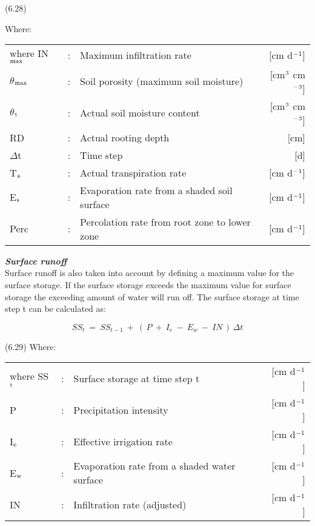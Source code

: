  
\strut\hfill (6.28)

Where:\\
\begin{tabularx}{\textwidth}{llXr}



where IN$_{{\rm max}}$ &:& Maximum infiltration rate  & [cm d$^{{\rm -1}}$]\\
$\theta$$_{{\rm max}}$ &:& Soil porosity (maximum soil moisture)  & [cm$^{{\rm 3}}$ cm$^{{\rm -3}}$]\\
$\theta$$_{{\rm t}}$ &:& Actual soil moisture content  & [cm$^{{\rm 3}}$ cm$^{{\rm -3}}$]\\
RD &:& Actual rooting depth  & [cm]\\
$\Delta$t &:& Time step  & [d]\\
T$_{{\rm a}}$ &:& Actual transpiration rate   & [cm d$^{{\rm -1}}$]\\
E$_{{\rm s}}$ &:& Evaporation rate from a shaded soil surface  & [cm d$^{{\rm -1}}$]\\
Perc &:& Percolation rate from root zone to lower zone  & [cm d$^{{\rm -1}}$]
\end{tabularx}
 {\bf {\it Surface runoff\/}}\\
Surface runoff is also taken into account by defining a maximum value for the surface
storage. If the surface storage exceeds the maximum value for surface storage the
exceeding amount of water will run off. The surface storage at time step t can be
calculated as:

\begin{equation}
SS_{t} ~=~ SS _{t-1} ~+~ (\, P ~+~ I _{e} ~-~ E _{w} ~-~ IN\, )\, \Delta t
\end{equation}

 
\strut\hfill (6.29)
Where:\\
\begin{tabularx}{\textwidth}{llXr}



where SS$_{{\rm t}}$ &:& Surface storage at time step t  & [cm d$^{{\rm -1}}$]\\
P &:& Precipitation intensity  & [cm d$^{{\rm -1}}$]\\
I$_{{\rm e}}$ &:& Effective irrigation rate  & [cm d$^{{\rm -1}}$]\\
E$_{{\rm w}}$ &:& Evaporation rate from a shaded water surface  & [cm d$^{{\rm -1}}$]\\
IN &:& Infiltration rate (adjusted)  & [cm d$^{{\rm -1}}$]
\end{tabularx}



